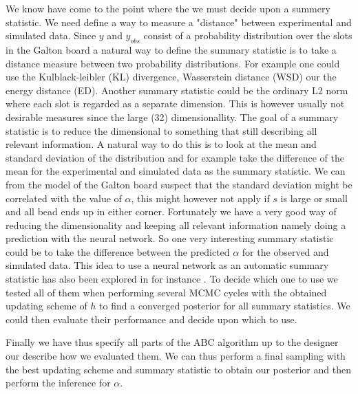 \documentclass[11pt,a4paper]{article}
\begin{document}
We know have come to the point where the we must decide upon a summery statistic. We need define a way to measure a "distance" between experimental and simulated data. Since $y$ and $y_{obs}$ consist of a probability distribution over the slots in the Galton board a natural way to define the summary statistic is to take a distance measure between two probability distributions. For example one could use the Kulblack-leibler (KL) divergence, Wasserstein distance (WSD) our the energy distance (ED). Another summary statistic could be the ordinary L2 norm where each slot is regarded as a separate dimension. This is however usually not desirable measures since the large (32) dimensionallity. The goal of a summary statistic is to reduce the dimensional to something that still describing all relevant information. A natural way to do this is to look at the mean and standard deviation of the distribution and for example take the difference of the mean for the experimental and simulated data as the summary statistic. We can from the model of the Galton board suspect that the standard deviation might be correlated with the value of $\alpha$, this might however not apply if $s$ is large or small and all bead ends up in either corner. Fortunately we have a very good way of reducing the dimensionality and keeping all relevant information namely doing a prediction with the neural network. So one very interesting summary statistic could be to take the difference between the predicted $\alpha$ for the observed and simulated data. This idea to use a neural network as an automatic summary statistic has also been explored in for instance \cite{NN_sum_stat}. To decide which one to use we tested all of them when performing several MCMC cycles with the obtained updating scheme of $h$ to find a converged posterior for all summary statistics. We could then evaluate their performance and decide upon which to use.

Finally we have thus specify all parts of the ABC algorithm up to the designer our describe how we evaluated them. We can thus perform a final sampling with the best updating scheme and summary statistic to obtain our posterior and then perform the inference for $\alpha$.


\end{document}
